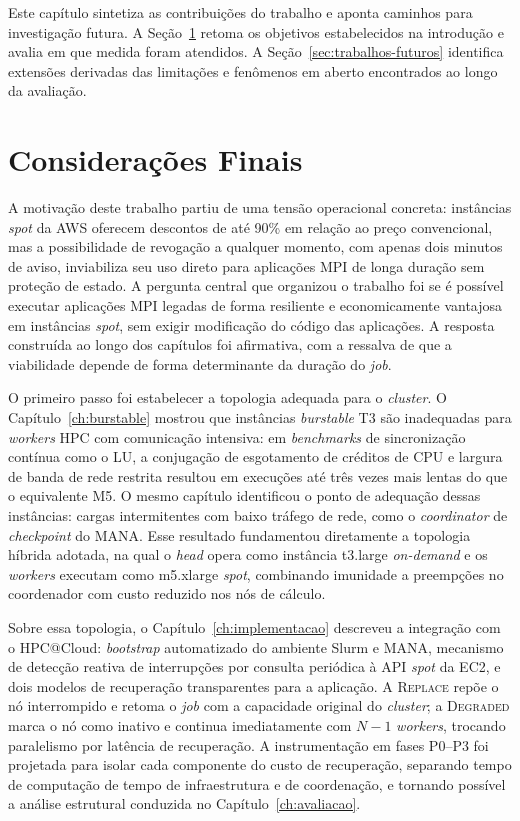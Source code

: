 Este capítulo sintetiza as contribuições do trabalho e aponta caminhos para investigação
futura. A Seção~\ref{sec:consideracoes-finais} retoma os objetivos estabelecidos na
introdução e avalia em que medida foram atendidos. A Seção~\ref{sec:trabalhos-futuros}
identifica extensões derivadas das limitações e fenômenos em aberto encontrados ao
longo da avaliação.

\section{Considerações Finais}
\label{sec:consideracoes-finais}

A motivação deste trabalho partiu de uma tensão operacional concreta: instâncias
\textit{spot} da AWS oferecem descontos de até 90\% em relação ao preço convencional,
mas a possibilidade de revogação a qualquer momento, com apenas dois minutos de aviso,
inviabiliza seu uso direto para aplicações MPI de longa duração sem proteção de estado.
A pergunta central que organizou o trabalho foi se é possível executar aplicações MPI
legadas de forma resiliente e economicamente vantajosa em instâncias \textit{spot}, sem
exigir modificação do código das aplicações. A resposta construída ao longo dos
capítulos foi afirmativa, com a ressalva de que a viabilidade depende de forma
determinante da duração do \textit{job}.

O primeiro passo foi estabelecer a topologia adequada para o \textit{cluster}. O
Capítulo~\ref{ch:burstable} mostrou que instâncias \textit{burstable} T3 são
inadequadas para \textit{workers} HPC com comunicação intensiva: em \textit{benchmarks}
de sincronização contínua como o LU, a conjugação de esgotamento de créditos de CPU e
largura de banda de rede restrita resultou em execuções até três vezes mais lentas do
que o equivalente M5. O mesmo capítulo identificou o ponto de adequação dessas
instâncias: cargas intermitentes com baixo tráfego de rede, como o \textit{coordinator}
de \textit{checkpoint} do MANA. Esse resultado fundamentou diretamente a topologia
híbrida adotada, na qual o \textit{head} opera como instância t3.large
\textit{on-demand} e os \textit{workers} executam como m5.xlarge \textit{spot},
combinando imunidade a preempções no coordenador com custo reduzido nos nós de cálculo.

Sobre essa topologia, o Capítulo~\ref{ch:implementacao} descreveu a integração com
o HPC@Cloud: \textit{bootstrap} automatizado do ambiente Slurm e MANA,
mecanismo de detecção reativa de interrupções por consulta periódica à API \textit{spot}
da EC2, e dois modelos de recuperação transparentes para a aplicação. A
\textsc{Replace} repõe o nó interrompido e retoma o \textit{job} com a capacidade
original do \textit{cluster}; a \textsc{Degraded} marca o nó como inativo e continua
imediatamente com $N{-}1$ \textit{workers}, trocando paralelismo por latência de
recuperação. A instrumentação em fases P0--P3 foi projetada para isolar cada componente
do custo de recuperação, separando tempo de computação de tempo de infraestrutura e de
coordenação, e tornando possível a análise estrutural conduzida no
Capítulo~\ref{ch:avaliacao}.

